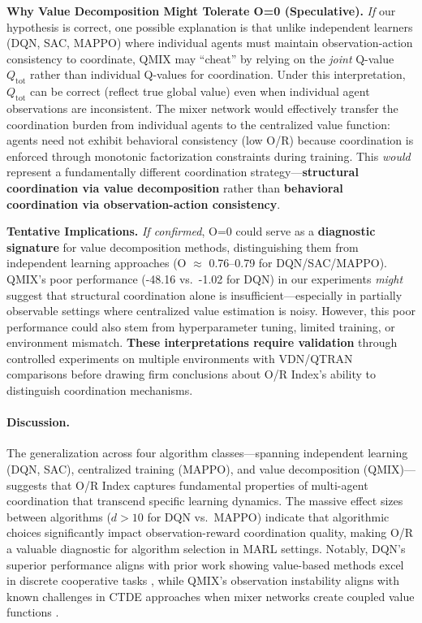 \textbf{Why Value Decomposition Might Tolerate O=0 (Speculative).} \textit{If} our hypothesis is correct, one possible explanation is that unlike independent learners (DQN, SAC, MAPPO) where individual agents must maintain observation-action consistency to coordinate, QMIX may ``cheat'' by relying on the \emph{joint} Q-value $Q_{\text{tot}}$ rather than individual Q-values for coordination. Under this interpretation, $Q_{\text{tot}}$ can be correct (reflect true global value) even when individual agent observations are inconsistent. The mixer network would effectively transfer the coordination burden from individual agents to the centralized value function: agents need not exhibit behavioral consistency (low O/R) because coordination is enforced through monotonic factorization constraints during training. This \textit{would} represent a fundamentally different coordination strategy---\textbf{structural coordination via value decomposition} rather than \textbf{behavioral coordination via observation-action consistency}.

\textbf{Tentative Implications.} \textit{If confirmed}, O=0 could serve as a \textbf{diagnostic signature} for value decomposition methods, distinguishing them from independent learning approaches (O $\approx$ 0.76--0.79 for DQN/SAC/MAPPO). QMIX's poor performance (-48.16 vs.\ -1.02 for DQN) in our experiments \textit{might} suggest that structural coordination alone is insufficient---especially in partially observable settings where centralized value estimation is noisy. However, this poor performance could also stem from hyperparameter tuning, limited training, or environment mismatch. \textbf{These interpretations require validation} through controlled experiments on multiple environments with VDN/QTRAN comparisons before drawing firm conclusions about O/R Index's ability to distinguish coordination mechanisms.

\paragraph{Discussion.}
The generalization across four algorithm classes—spanning independent learning (DQN, SAC), centralized training (MAPPO), and value decomposition (QMIX)—suggests that O/R Index captures fundamental properties of multi-agent coordination that transcend specific learning dynamics. The massive effect sizes between algorithms ($d > 10$ for DQN vs.\ MAPPO) indicate that algorithmic choices significantly impact observation-reward coordination quality, making O/R a valuable diagnostic for algorithm selection in MARL settings. Notably, DQN's superior performance aligns with prior work showing value-based methods excel in discrete cooperative tasks \citep{sunehag2017value}, while QMIX's observation instability aligns with known challenges in CTDE approaches when mixer networks create coupled value functions \citep{rashid2018qmix}.

